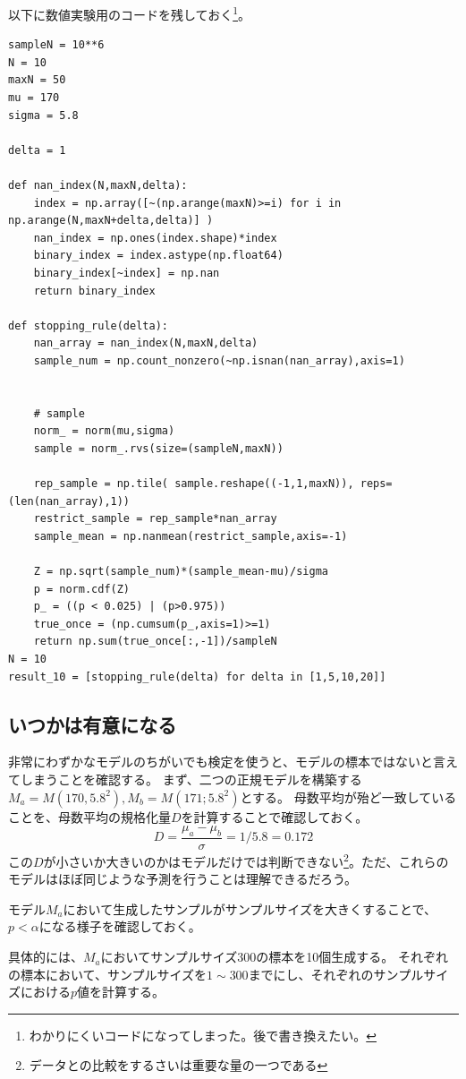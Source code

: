 以下に数値実験用のコードを残しておく\footnote{わかりにくいコードになってしまった。後で書き換えたい。}。
\begin{lstlisting}
sampleN = 10**6
N = 10
maxN = 50
mu = 170
sigma = 5.8

delta = 1

def nan_index(N,maxN,delta):
    index = np.array([~(np.arange(maxN)>=i) for i in np.arange(N,maxN+delta,delta)] )
    nan_index = np.ones(index.shape)*index
    binary_index = index.astype(np.float64)
    binary_index[~index] = np.nan
    return binary_index

def stopping_rule(delta):
    nan_array = nan_index(N,maxN,delta)
    sample_num = np.count_nonzero(~np.isnan(nan_array),axis=1)


    # sample
    norm_ = norm(mu,sigma)
    sample = norm_.rvs(size=(sampleN,maxN))

    rep_sample = np.tile( sample.reshape((-1,1,maxN)), reps= (len(nan_array),1))
    restrict_sample = rep_sample*nan_array
    sample_mean = np.nanmean(restrict_sample,axis=-1)

    Z = np.sqrt(sample_num)*(sample_mean-mu)/sigma
    p = norm.cdf(Z)
    p_ = ((p < 0.025) | (p>0.975))
    true_once = (np.cumsum(p_,axis=1)>=1)
    return np.sum(true_once[:,-1])/sampleN
N = 10
result_10 = [stopping_rule(delta) for delta in [1,5,10,20]]
\end{lstlisting}

\subsection{いつかは有意になる}\label{large_sample_size_significant}
非常にわずかなモデルのちがいでも検定を使うと、モデルの標本ではないと言えてしまうことを確認する。
まず、二つの正規モデルを構築する$M_a=M(170,5.8^2),M_b=M(171;5.8^2)$とする。
母数平均が殆ど一致していることを、母数平均の規格化量$D$を計算することで確認しておく。
\begin{equation*}
 D=\frac{\mu_a-\mu_b}{\sigma} = 1/5.8=0.172
\end{equation*}
この$D$が小さいか大きいのかはモデルだけでは判断できない\footnote{データとの比較をするさいは重要な量の一つである}。ただ、これらのモデルはほぼ同じような予測を行うことは理解できるだろう。

モデル$M_a$において生成したサンプルがサンプルサイズを大きくすることで、$p<\alpha$になる様子を確認しておく。

具体的には、$M_a$においてサンプルサイズ$300$の標本を10個生成する。
それぞれの標本において、サンプルサイズを$1\sim 300$までにし、それぞれのサンプルサイズにおける$p$値を計算する。

